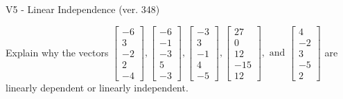 \begin{exercise}
  \begin{exerciseTitle}V5 - Linear Independence (ver. 348)\end{exerciseTitle}
  \begin{exerciseStatement}
    Explain why the vectors \(\left[\begin{array}{r}
-6 \\
3 \\
-2 \\
2 \\
-4
\end{array}\right] , \left[\begin{array}{r}
-6 \\
-1 \\
-3 \\
5 \\
-3
\end{array}\right] , \left[\begin{array}{r}
-3 \\
3 \\
-1 \\
4 \\
-5
\end{array}\right] , \left[\begin{array}{r}
27 \\
0 \\
12 \\
-15 \\
12
\end{array}\right] , \text{ and } \left[\begin{array}{r}
4 \\
-2 \\
3 \\
-5 \\
2
\end{array}\right]\) are linearly dependent or linearly independent.	



\end{exerciseStatement}
\end{exercise}
